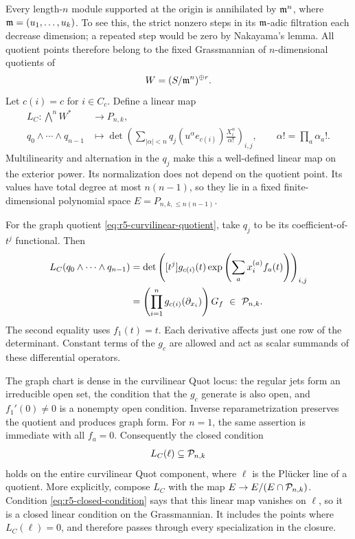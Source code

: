 Every length-$n$ module supported at the origin is annihilated by
$\mathfrak m^n$, where $\mathfrak m=(u_1,\ldots,u_k)$.  To see this, the strict
nonzero steps in its $\mathfrak m$-adic filtration each decrease dimension;
a repeated step would be zero by Nakayama's lemma.  All quotient
points therefore belong to the fixed Grassmannian of $n$-dimensional
quotients of
\[
                     W=(S/\mathfrak m^n)^{\oplus r}.
\]
Let $c(i)=c$ for $i\in C_c$.  Define a linear map
\begin{equation}\label{eq:r5-colored-map}
 \begin{split}
 L_C:\bigwedge^nW^*&\longrightarrow P_{n,k},\\
 q_0\wedge\cdots\wedge q_{n-1}
   &\longmapsto
 \det\left(\sum_{|\alpha|<n}
        q_j(u^\alpha e_{c(i)})\frac{X_i^\alpha}{\alpha!}\right)_{i,j},
 \qquad \alpha!=\prod_a\alpha_a!.
 \end{split}
\end{equation}
Multilinearity and alternation in the $q_j$ make this a well-defined
linear map on the exterior power.  Its normalization does not depend
on the quotient point.  Its values have total degree at most
$n(n-1)$, so they lie in a fixed finite-dimensional polynomial
space $E=P_{n,k,\le n(n-1)}$.

For the graph quotient \eqref{eq:r5-curvilinear-quotient}, take
$q_j$ to be its coefficient-of-$t^j$ functional.  Then
\begin{align}
 L_C(q_0\wedge\cdots\wedge q_{n-1})
  &=\det\left([t^j]g_{c(i)}(t)
                \exp\left(\sum_a x_i^{(a)}f_a(t)\right)\right)_{i,j}
       \label{eq:r5-curv-image}\\
  &=\left(\prod_{i=1}^n g_{c(i)}(\partial_{x_i})\right)G_f
       \ \in\ \mathcal P_{n,k}.\nonumber
\end{align}
The second equality uses $f_1(t)=t$.  Each derivative affects just
one row of the determinant.  Constant terms of the $g_c$ are allowed
and act as scalar summands of these differential operators.

The graph chart is dense in the curvilinear Quot locus: the regular
jets form an irreducible open set, the condition that the $g_c$
generate is also open, and $f_1'(0)\ne0$ is a nonempty open condition.
Inverse reparametrization preserves the quotient and produces graph
form.  For $n=1$, the same assertion is immediate with all $f_a=0$.
Consequently the closed condition
\begin{equation}\label{eq:r5-closed-condition}
                        L_C(\ell)\subseteq\mathcal P_{n,k}
\end{equation}
holds on the entire curvilinear Quot component, where $\ell$ is the
Pl\"ucker line of a quotient.  More explicitly, compose $L_C$ with
the map $E\to E/(E\cap\mathcal P_{n,k})$.
Condition \eqref{eq:r5-closed-condition} says that this linear map
vanishes on $\ell$, so it is a closed linear condition on the
Grassmannian.  It includes the points where $L_C(\ell)=0$, and
therefore passes through every specialization in the closure.

